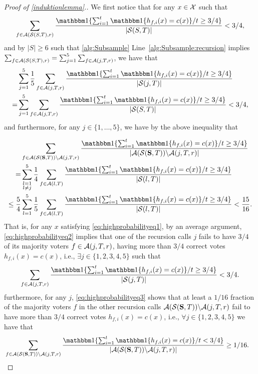 \begin{proof}[Proof of \cref{induktionlemma}.]
    We first notice that for any $x\in \mathcal{X}$ such that 
    \begin{align}\label{eq:highprobabilityeq1}
      \sum_{f\in \cA(\cS(S,T),r)} \frac{\ind\{\sum_{i=1}^{t} \ind\{h_{f,i}(x)=c(x)\}/t\geq 3/4\}}{|\cS(S,T)|}< 3/4,
    \end{align}
    and by $|S|\geq 6$ such that \cref{alg:Subsample} Line~\ref{alg:Subsample:recursion} implies $\sum_{f\in \mathcal{A}(\mathcal{S}(S,T),r)}=\sum_{j=1}^{5}\sum_{f\in \mathcal{A}(j,T,r)}$, we have that 
    \begin{align}\label{eq:highprobabilityeq2}
     &\sum_{j=1}^{5} \frac{1}{5}\sum_{f\in \cA(j,T,r)} \frac{\ind\{\sum_{i=1}^{t} \ind\{h_{f,i}(x)=c(x)\}/t\geq 3/4\}}{|\cS(j,T)|}\nonumber
     \\
     =&
     \sum_{j=1}^{5} \sum_{f\in \cA(j,T,r)} \frac{\ind\{\sum_{i=1}^{t} \ind\{h_{f,i}(x)=c(x)\}/t\geq 3/4\}}{|\cS(S,T)|}
     < 3/4,
    \end{align}
and furthermore, for any $j\in\{1,\ldots,5\}$, we have by the above inequality that  
    
    \begin{align}\label{eq:highprobabilityeq3}
      &\sum_{f\in \cA(\cS(\rS,T))\backslash\cA(j,T,r)} \frac{\ind\{\sum_{i=1}^{t} \ind\{h_{f,i}(x)=c(x)\}/t\geq 3/4\}}{|\cA(\cS(\rS,T))\backslash\cA(j,T,r)|}\nonumber\\
      =
      &\sum_{\substack{l=1\\ l\not=j}}^{5} \frac{1}{4}\sum_{f\in \cA(l,T)} \frac{\ind\{\sum_{i=1}^{t} \ind\{h_{f,i}(x)=c(x)\}/t\geq 3/4\}}{|\cS(l,T)|}\nonumber
      \\
       \leq \frac{5}{4}&\sum_{l=1}^{5} \frac{1}{5}\sum_{f\in \cA(l,T)} \frac{\ind\{\sum_{i=1}^{t} \ind\{h_{f,i}(x)=c(x)\}/t\geq 3/4\}}{|\cS(l,T)|}
      <\frac{15}{16}.
     \end{align}
That is, for any $x$ satisfying \cref{eq:highprobabilityeq1}, by an average argument, \cref{eq:highprobabilityeq2} implies that one of the recursion calls $j$ fails to have $3/4$ of its majority voters $f\in \mathcal{A}(j,T,r)$, having more than $3/4$ correct votes $h_{f,i}(x)=c(x)$, i.e., $\exists j \in\{1,2,3,4,5\}$ such that 
    \begin{align}\label{eq:highprobabilityeq4}
      \sum_{f\in \cA(j,T,r)} \frac{\ind\{\sum_{i=1}^{t} \ind\{h_{f,i}(x)=c(x)\}/t\geq 3/4\}}{|\cS(j,T)|}<3/4. 
    \end{align}
furthermore, for any $j$, \cref{eq:highprobabilityeq3} shows that at least a $1/16$ fraction of the majority voters $f$ in the other recursion calls $\mathcal{A}(\mathcal{S}(\mathbf{S},T))\backslash\mathcal{A}(j,T,r)$ fail to have more than $3/4$ correct votes $h_{f,i}(x)=c(x)$, i.e., $\forall j\in\{1,2,3,4,5\}$ we have that
    \begin{align}\label{eq:highprobabilityeq5}
      &\sum_{f\in \cA(\cS(\rS,T))\backslash\cA(j,T,r)} \frac{\ind\{\sum_{i=1}^{t} \ind\{h_{f,i}(x)=c(x)\}/t< 3/4\}}{|\cA(\cS(\rS,T))\backslash\cA(j,T,r)|}\geq 1/16.
    \end{align} 
    

\end{proof}
